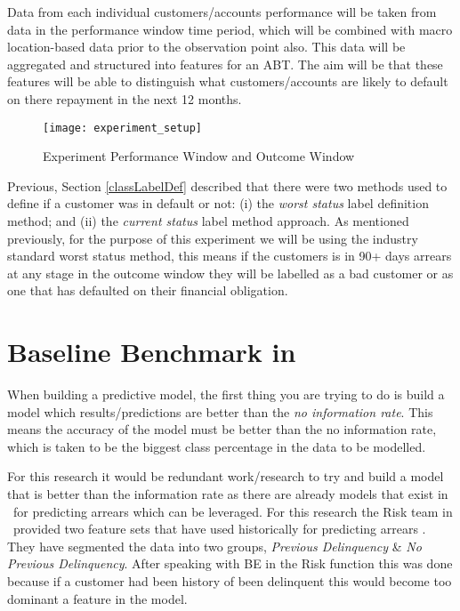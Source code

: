 Data from each individual customers/accounts performance will be taken from data in the performance window time period, which will be combined with macro location-based data prior to the observation point also. This data will be aggregated and structured into features for an ABT. The aim will be that these features will be able to distinguish what customers/accounts are likely to default on there repayment in the next 12 months. 

\begin{figure}[h!]
	\texttt{[image: experiment\_setup]}
	\caption[Experiment Performance Window and Outcome Window]
	{Experiment Performance Window and Outcome Window}
	\label{fig:experiment_setup}
\end{figure}

Previous, Section \ref{classLabelDef} described that there were two methods used to define if a customer was in default or not: (i) the \textit{worst status} label definition method; and (ii) the \textit{current status} label method approach. As mentioned previously, for the purpose of this experiment we will be using the industry standard worst status method, this means if the customers is in 90+ days arrears at any stage in the outcome window they will be labelled as a bad customer or as one that has defaulted on their financial obligation. 

\section{Baseline Benchmark in \subjectname\ }
When building a predictive model, the first thing you are trying to do is build a model which results/predictions are better than the \textit{no information rate}. This means the accuracy of the model must be better than the no information rate, which is taken to be the biggest class percentage in the data to be modelled.

For this research it would be redundant work/research to try and build a model that is better than the information rate as there are already models that exist in \subjectname\ for predicting arrears which can be leveraged. For this research the Risk team in \subjectname\ provided two feature sets that have used historically for predicting arrears \subjectname. They have segmented the data into two groups, \textit{Previous Delinquency} \& \textit{No Previous Delinquency}. After speaking with BE in the Risk function this was done because if a customer had been history of been delinquent this would become too dominant a feature in the model.

